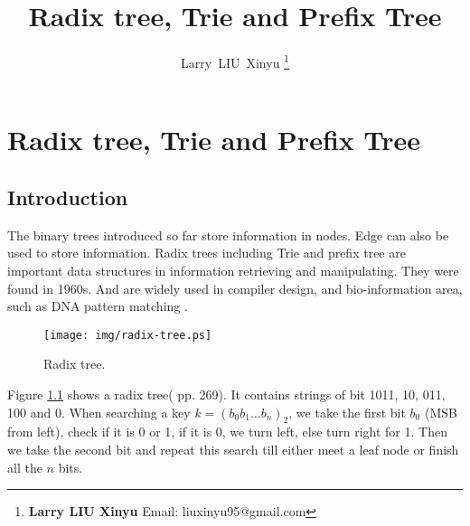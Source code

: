 \documentclass{article}
\begin{document}


\title{Radix tree, Trie and Prefix Tree}

\author{Larry~LIU~Xinyu
\thanks{{\bfseries Larry LIU Xinyu } \newline
  Email: liuxinyu95@gmail.com \newline}
  }

\maketitle
\fi


\ifx\wholebook\relax
\chapter{Radix tree, Trie and Prefix Tree}
\fi



\section{Introduction}
\label{introduction}

The binary trees introduced so far store information in nodes. Edge
can also be used to store information.
Radix trees including Trie and prefix tree are important data structures in
information retrieving and manipulating.
They were found in 1960s. And are widely used in
compiler design\cite{okasaki-int-map}, and bio-information area, such as
DNA pattern matching \cite{wiki-suffix-tree}.

\begin{figure}[htbp]
  \centering
  \texttt{[image: img/radix-tree.ps]}
  \caption{Radix tree.} \label{fig:radix-tree}
\end{figure}

Figure \ref{fig:radix-tree} shows a radix tree(\cite{CLRS} pp. 269).
It contains strings of bit 1011, 10, 011, 100 and 0.
When searching a key $k=(b_0b_1...b_n)_2$, we
take the first bit $b_0$ (MSB from left), check if it is 0 or 1, if it
is 0, we turn left, else turn right for 1. Then we take the second bit and
repeat this search till either meet a leaf node or finish all the $n$ bits.
\end{document}
